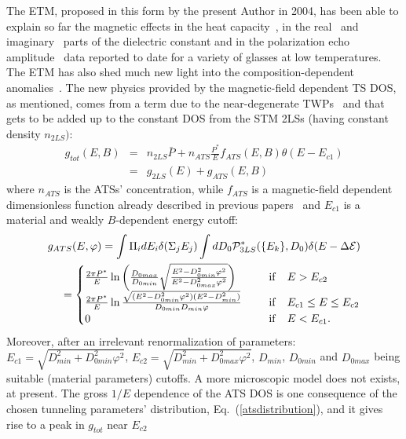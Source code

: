 \documentclass[10pt]{article}
\begin{document}
The ETM, proposed in this form by the present Author in 2004,  has been able to 
explain so far the magnetic effects in the heat capacity~\cite{Jug2004}, in the 
real~\cite{Jug2009} and imaginary~\cite{Jug2014} parts of the dielectric constant 
and in the polarization echo amplitude~\cite{Jug2014} data reported to date for
a variety of glasses at low temperatures. The ETM has also shed much new light  
into the composition-dependent anomalies~\cite{Jug2010,Jug2013}.
The new physics provided by the magnetic-field dependent TS DOS, as mentioned,
comes from a term due to the near-degenerate TWPs~\cite{Jug2004} and that gets 
to be added up to the constant DOS from the STM 2LSs (having constant density 
$n_{2LS})$:
\begin{eqnarray}
g_{tot}(E,B)&=&n_{2LS}\bar{P}
+n_{ATS}\frac{P^{\ast}}{E}f_{ATS}(E,B)\theta(E-E_{c1}) \nonumber \\ 
&=&g_{2LS}(E)+g_{ATS}(E,B) 
\label{dos}
\end{eqnarray}
where $n_{ATS}$ is the ATSs' concentration, while $f_{ATS}$ is a 
magnetic-field dependent dimensionless function already described in previous 
papers~\cite{Jug2004} and $E_{c1}$ is a material and weakly $B$-dependent 
energy cutoff:
\begin{eqnarray}
g_{ATS}(E,\varphi)=\int \Pi_i dE_i \delta(\Sigma_j E_j) \int d D_0
{\cal P}^*_{3LS}(\{E_k\},D_0) \delta(E-\Delta{\cal E}) \cr
=\begin{cases}
\frac{2\pi P^*}{E}\ln\left( \frac{D_{0max}}{D_{0min}}
\sqrt{ \frac{E^2-D_{0min}^2\varphi^2}{E^2-D_{0max}^2\varphi^2} }
\right) \qquad &{\rm if} \quad E>E_{c2}  \cr
\frac{2\pi P^*}{E}\ln \frac{ \sqrt{ (E^2-D_{0min}^2\varphi^2)
(E^2-D_{min}^2) } }{ D_{0min}D_{min}\varphi }
&{\rm if} \quad E_{c1}\leq E \leq E_{c2}   \cr
0 &{\rm if} \quad E<E_{c1}. \cr
\end{cases}
\label{3dos}
\end{eqnarray}
Moreover, after an irrelevant renormalization of parameters: 
$E_{c1}=\sqrt{D_{min}^2+D_{0min}^2\varphi^2}$, 
$E_{c2}=\sqrt{D_{min}^2+D_{0max}^2\varphi^2}$, $D_{min}$, $D_{0min}$ and
$D_{0max}$ being suitable (material parameters) cutoffs. A more microscopic model
does not exists, at present. The gross $1/E$ dependence of the ATS DOS is one
consequence of the chosen tunneling parameters' distribution, 
Eq.~(\ref{atsdistribution}), and it gives rise to a peak in $g_{tot}$ near $E_{c2}$ 
\end{document}
